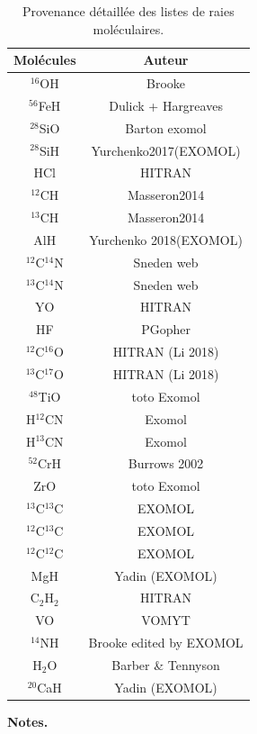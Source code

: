 \documentclass{article}
\begin{document}
 \begin{table}[h!]
  \vspace{0.3cm}
 \begin{center}
	\begin{tabular}{cc}
        \hline
		\hline
        Molécules & Auteur \\
        \hline
        $^{16}$OH & Brooke \\
        $^{56}$FeH & Dulick + Hargreaves \\
        $^{28}$SiO & Barton exomol \\
        $^{28}$SiH & Yurchenko2017(EXOMOL) \\
        HCl & HITRAN \\
        $^{12}$CH & Masseron2014 \\
        $^{13}$CH & Masseron2014 \\
        AlH & Yurchenko 2018(EXOMOL) \\
        $^{12}$C$^{14}$N & Sneden web \\
        $^{13}$C$^{14}$N & Sneden web \\
        YO & HITRAN \\
        HF & PGopher \\
        $^{12}$C$^{16}$O & HITRAN (Li 2018) \\
        $^{13}$C$^{17}$O & HITRAN (Li 2018) \\
        $^{48}$TiO & toto Exomol \\
        H$^{12}$CN & Exomol \\
        H$^{13}$CN & Exomol \\
        $^{52}$CrH & Burrows 2002 \\
        ZrO & toto Exomol \\
        $^{13}$C$^{13}$C & EXOMOL\\
        $^{12}$C$^{13}$C & EXOMOL\\
        $^{12}$C$^{12}$C & EXOMOL\\
        MgH & Yadin (EXOMOL) \\
        C$_2$H$_2$ & HITRAN \\
        VO & VOMYT \\
        $^{14}$NH &  Brooke edited by EXOMOL \\
        H$_2$O & Barber \& Tennyson \\
        $^{20}$CaH & Yadin (EXOMOL) \\
    \end{tabular}
\end{center} 
\caption{Provenance détaillée des listes de raies moléculaires.}
\label{origine_mol}
\textbf{Notes.}
\end{table}
\end{document}
